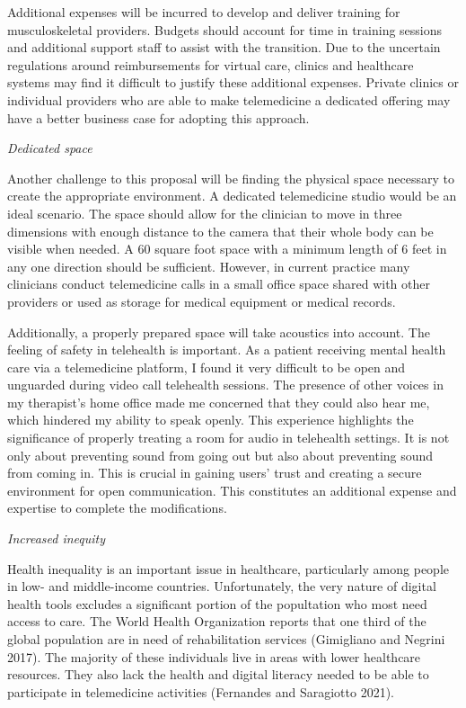 \documentclass[
  letterpaper,
]{article}
\begin{document}
Additional expenses will be incurred to develop and deliver training for
musculoskeletal providers. Budgets should account for time in training
sessions and additional support staff to assist with the transition. Due
to the uncertain regulations around reimbursements for virtual care,
clinics and healthcare systems may find it difficult to justify these
additional expenses. Private clinics or individual providers who are
able to make telemedicine a dedicated offering may have a better
business case for adopting this approach.

\emph{Dedicated space}

Another challenge to this proposal will be finding the physical space
necessary to create the appropriate environment. A dedicated
telemedicine studio would be an ideal scenario. The space should allow
for the clinician to move in three dimensions with enough distance to
the camera that their whole body can be visible when needed. A 60 square
foot space with a minimum length of 6 feet in any one direction should
be sufficient. However, in current practice many clinicians conduct
telemedicine calls in a small office space shared with other providers
or used as storage for medical equipment or medical records.

Additionally, a properly prepared space will take acoustics into
account. The feeling of safety in telehealth is important. As a patient
receiving mental health care via a telemedicine platform, I found it
very difficult to be open and unguarded during video call telehealth
sessions. The presence of other voices in my therapist's home office
made me concerned that they could also hear me, which hindered my
ability to speak openly. This experience highlights the significance of
properly treating a room for audio in telehealth settings. It is not
only about preventing sound from going out but also about preventing
sound from coming in. This is crucial in gaining users' trust and
creating a secure environment for open communication. This constitutes
an additional expense and expertise to complete the modifications.

\emph{Increased inequity}

Health inequality is an important issue in healthcare, particularly
among people in low- and middle-income countries. Unfortunately, the
very nature of digital health tools excludes a significant portion of
the popultation who most need access to care. The World Health
Organization reports that one third of the global population are in need
of rehabilitation services (Gimigliano and Negrini 2017). The majority
of these individuals live in areas with lower healthcare resources. They
also lack the health and digital literacy needed to be able to
participate in telemedicine activities (Fernandes and Saragiotto 2021).
\end{document}
